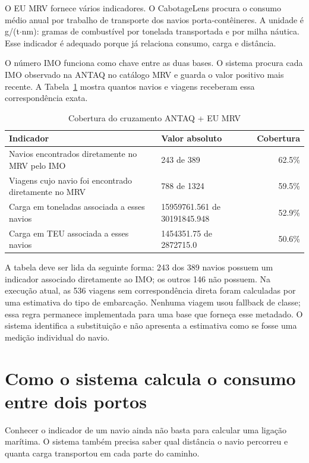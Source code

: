 \documentclass[12pt,a4paper]{report}
\begin{document}
O EU MRV fornece vários indicadores. O CabotageLens procura o consumo médio anual por trabalho de transporte dos navios porta-contêineres. A unidade é g/(t$\cdot$nm): gramas de combustível por tonelada transportada e por milha náutica. Esse indicador é adequado porque já relaciona consumo, carga e distância.

O número IMO funciona como chave entre as duas bases. O sistema procura cada IMO observado na ANTAQ no catálogo MRV e guarda o valor positivo mais recente. A Tabela~\ref{tab:cobertura-mrv} mostra quantos navios e viagens receberam essa correspondência exata.

\begin{table}[htbp]
\centering
\small
\caption{Cobertura do cruzamento ANTAQ + EU MRV}
\label{tab:cobertura-mrv}
\begin{tabular}{>{\raggedright\arraybackslash}p{} >{\raggedright\arraybackslash}p{} r}
\toprule
Indicador & Valor absoluto & Cobertura \\
\midrule
Navios encontrados diretamente no MRV pelo IMO & \num{243} de \num{389} & \num{62.5}\% \\
Viagens cujo navio foi encontrado diretamente no MRV & \num{788} de \num{1324} & \num{59.5}\% \\
Carga em toneladas associada a esses navios & \num{15959761.561} de \num{30191845.948} & \num{52.9}\% \\
Carga em TEU associada a esses navios & \num{1454351.75} de \num{2872715.0} & \num{50.6}\% \\
\bottomrule
\end{tabular}
\end{table}

A tabela deve ser lida da seguinte forma: 243 dos 389 navios possuem um indicador associado diretamente ao IMO; os outros 146 não possuem. Na execução atual, as 536 viagens sem correspondência direta foram calculadas por uma estimativa do tipo de embarcação. Nenhuma viagem usou fallback de classe; essa regra permanece implementada para uma base que forneça esse metadado. O sistema identifica a substituição e não apresenta a estimativa como se fosse uma medição individual do navio.

\section{Como o sistema calcula o consumo entre dois portos}

Conhecer o indicador de um navio ainda não basta para calcular uma ligação marítima. O sistema também precisa saber qual distância o navio percorreu e quanta carga transportou em cada parte do caminho.
\end{document}
